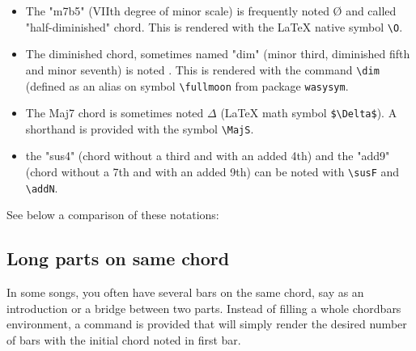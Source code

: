 \documentclass[11pt]{article}
\begin{document}
\begin{itemize}
\item The "m7b5" (VIIth degree of minor scale) is frequently noted \O{} and called "half-diminished" chord.
This is rendered with the \LaTeX{} native symbol {\tt \textbackslash O}.
\item The diminished chord, sometimes named "dim" (minor third, diminished fifth and minor seventh) is noted \dim.
This is rendered with the command {\tt \textbackslash dim}
(defined as an alias on symbol {\tt \textbackslash fullmoon} from package {\tt wasysym}.
\item The Maj7 chord is sometimes noted $\Delta$
(\LaTeX{} math symbol {\tt \$\textbackslash Delta\$}).
A shorthand is provided with the symbol {\tt \textbackslash MajS}.

\item the "sus4" (chord without a third and with an added 4th) and the "add9" (chord without a 7th and with an added 9th) can be noted with 
{\tt \textbackslash susF} and {\tt \textbackslash addN}.
\end{itemize}

See below a comparison of these notations:

\def\chordFontSize{\normalsize\bfseries}
\noindent
\begin{minipage}{0.40\textwidth}

\end{minipage}
%
\begin{minipage}{0.60\textwidth}
\def\NumberOfBarsPerLine{5}
\def\barsize{2.3}

\end{minipage}


\subsection{Long parts on same chord}
In some songs, you often have several bars on the same chord, say as an introduction or a bridge between two parts.
Instead of filling a whole chordbars environment, a command is provided that will simply render the desired number of bars with the initial chord noted in first bar.
\end{document}
